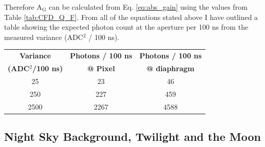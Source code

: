 Therefore A$_{\mathrm{G}}$ can be calculated from Eq. \ref{eq:abs_gain} using the values from Table \ref{tab:CFD_Q_F}. From all of the equations stated above I have outlined a table showing the expected photon count at the aperture per 100 ns from the measured variance (ADC$^2$ / 100 ns).
\begin{center}
\begin{tabular}{| c | c | c | }
\hline \hline
\textbf{Variance} & \textbf{Photons / 100 ns} & \textbf{Photons / 100 ns} \\
\textbf{(ADC$^2$/100 ns)} & \textbf{@ Pixel} & \textbf{@ diaphragm} \\
\hline \hline
25  & 23 & 46 \\
\hline
250  & 227 & 459 \\
\hline
2500  & 2267 & 4588 \\
\hline
\end{tabular}
\end{center}

\subsection{Night Sky Background, Twilight and the Moon}

